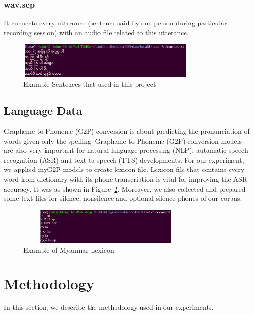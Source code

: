 \documentclass[conference]{IEEEtran}
\begin{document}
\subsubsection{wav.scp}
\label{subsec:wav.scp}
It connects every utterance (sentence said by one person during particular recording session) with an audio file related to this utterance.

\begin{figure}[htbp]
\centerline{\includegraphics[width=3.5in, height=0.7in]{acdata.png}}
\caption{Example Sentences that used in this project}
\label{fig:acdatafig}
\end{figure}

\subsection{Language Data}
\label{sec:LanguageData}
Grapheme-to-Phoneme (G2P) conversion is about predicting the pronunciation of words given only the spelling. Grapheme-to-Phoneme (G2P) conversion models are also very important for natural language processing (NLP), automatic speech recognition (ASR) and text-to-speech (TTS) developments. For our experiment, we applied myG2P models to create lexicon file. Lexicon file that contains every word from dictionary with its phone transcription is vital for improving the ASR accuracy. It was as shown in Figure~\ref{fig:ldatafig}. Moreover, we also collected and prepared some text files for silence, nonsilence and optional silence phones of our corpus. 
\begin{figure}[htbp]
\centerline{\includegraphics[width=3.5in, height=0.7in]{Fig2.png}}
\caption{Example of Myanmar Lexicon}
\label{fig:ldatafig}
\end{figure}


\section{Methodology}
\label{sec:Methodology}
In this section, we describe the methodology used in our experiments.
\end{document}
